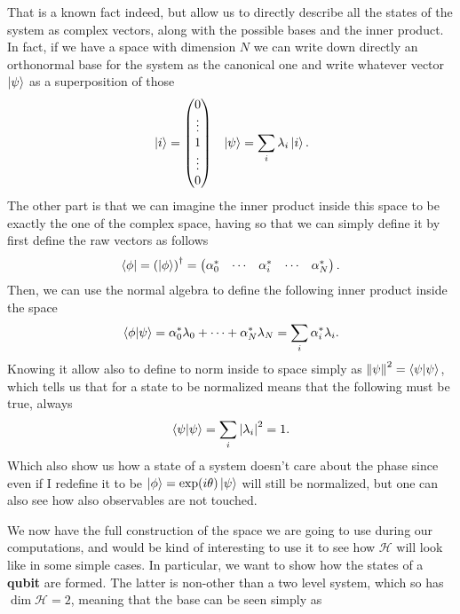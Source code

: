
\noindent
That is a known fact indeed, but allow us to directly describe all the states of the system as complex vectors, along with the possible bases and the inner product. In fact, if we have a space with dimension $N$ we can write down directly an orthonormal base for the system as the canonical one and write whatever vector $\ket{\psi}$ as a superposition of those
\begin{align*}
    &\ket{i} = \begin{pmatrix}
        0\\
        \vdots\\
        1\\
        \vdots\\
        0\\
    \end{pmatrix}
    & \ket{\psi} = \sum_i \lambda_i \ket{i}.
\end{align*}
The other part is that we can imagine the inner product inside this space to be exactly the one of the complex space, having so that we can simply define it by first define the raw vectors as follows
\begin{align*}
    \bra{\phi} = \left(\ket{\phi}\right)^\dagger =  \begin{pmatrix}
        \alpha_0^*&
        \cdots&
        \alpha_i^*&
        \cdots&
        \alpha_N^*
    \end{pmatrix}.
\end{align*}
Then, we can use the normal algebra to define the following inner product inside the space
\begin{align*}
    \braket{\phi}{\psi} = \alpha_0^*\lambda_0 + \cdots + \alpha_N^*\lambda_N = \sum_i \alpha_i^*\lambda_i.
\end{align*}
Knowing it allow also to define to norm inside to space simply as $\norm{\psi}^2 = \braket{\psi}{\psi}$, which tells us that for a state to be normalized means that the following must be true, always
\begin{align}
    \braket{\psi}{\psi} = \sum_i \abs{\lambda_i}^2 = 1.
\end{align}
Which also show us how a state of a system doesn't care about the phase since even if I redefine it to be $\ket{\phi} = \exp(i\theta)\ket{\psi}$ will still be normalized, but one can also see how also observables are not touched.

We now have the full construction of the space we are going to use during our computations, and would be kind of interesting to use it to see how $\mathcal{H}$ will look like in some simple cases. In particular, we want to show how the states of a \textbf{qubit} are formed. The latter is non-other than a two level system, which so has $\dim\mathcal{H} = 2$, meaning that the base can be seen simply as

